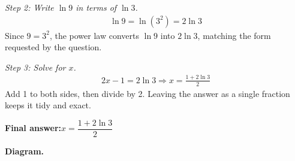 \documentclass[11pt]{article}
\begin{document}
\textit{Step 2: Write \( \ln 9 \) in terms of \( \ln 3 \).}
\[\begin{gathered}
\ln 9 = \ln(3^2) = 2\ln 3
\end{gathered}\]
Since \( 9 = 3^2 \), the power law converts \( \ln 9 \) into \( 2\ln 3 \), matching the form requested by the question.

\textit{Step 3: Solve for \( x \).}
\[\begin{gathered}
2x - 1 = 2\ln 3 \Rightarrow x = \frac{1 + 2\ln 3}{2}
\end{gathered}\]
Add 1 to both sides, then divide by 2. Leaving the answer as a single fraction keeps it tidy and exact.

\begin{answerbox}
\textbf{Final answer:}\quad \(\displaystyle  x = \dfrac{1 + 2\ln 3}{2} \)
\end{answerbox}
\textbf{Diagram.}
\end{document}
